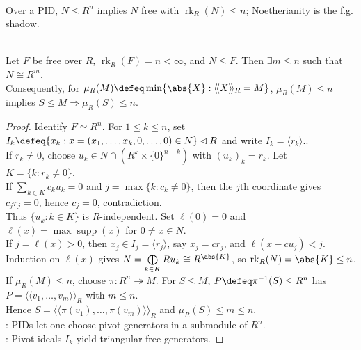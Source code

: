 \begin{perspective} \label{per:pid-noetherian-specialization} \\
Over a PID, $N\leq R^n$ implies $N$ free with $\operatorname{rk}_R(N)\leq n$; Noetherianity is the f.g. shadow.
\end{perspective}

\begin{theorem} \label{thm:submodule-of-finite-free-pid-is-free} \\
Let $F$ be free over $R$, $\operatorname{rk}_R(F)=n<\infty$, and $N\leq F$. Then $\exists m\leq n$ such that $N\cong R^m$.\\
Consequently, for $\mu_R(M)\defeq\min\{\abs{X}:\langle\!\langle X\rangle\!\rangle_R=M\}$, $\mu_R(M)\leq n$ implies $S\leq M\Longrightarrow \mu_R(S)\leq n$.
\begin{proof}
Identify $F\simeq R^n$. For $1\leq k\leq n$, set $I_k\defeq\{x_k:x=(x_1,\ldots,x_k,0,\ldots,0)\in N\}\lhd R$ and write $I_k=\langle r_k\rangle$..\\
If $r_k\neq0$, choose $u_k\in N\cap(R^k\times\{0\}^{n-k})$ with $(u_k)_k=r_k$. Let $K=\{k:r_k\neq0\}$.\\
If $\sum\limits_{k\in K}c_ku_k=0$ and $j=\max\{k:c_k\neq0\}$, then the $j$th coordinate gives $c_jr_j=0$, hence $c_j=0$, contradiction.\\
Thus $\{u_k:k\in K\}$ is $R$-independent. Set $\ell(0)=0$ and $\ell(x)=\max\operatorname{supp}(x)$ for $0\neq x\in N$.\\
If $j=\ell(x)>0$, then $x_j\in I_j=\langle r_j\rangle$, say $x_j=cr_j$, and $\ell(x-cu_j)<j$.\\
Induction on $\ell(x)$ gives $N=\bigoplus\limits_{k\in K}Ru_k\cong R^{\abs{K}}$, so $\operatorname{rk}_R(N)=\abs{K}\leq n$.\\
If $\mu_R(M)\leq n$, choose $\pi:R^n\twoheadrightarrow M$. For $S\leq M$, $P\defeq\pi^{-1}(S)\leq R^n$ has $P=\langle\!\langle v_1,\ldots,v_m\rangle\!\rangle_R$ with $m\leq n$.\\
Hence $S=\langle\!\langle \pi(v_1),\ldots,\pi(v_m)\rangle\!\rangle_R$ and $\mu_R(S)\leq m\leq n$.\\
: PIDs let one choose pivot generators in a submodule of $R^n$.\\
: Pivot ideals $I_k$ yield triangular free generators.
\end{proof}
\end{theorem}


